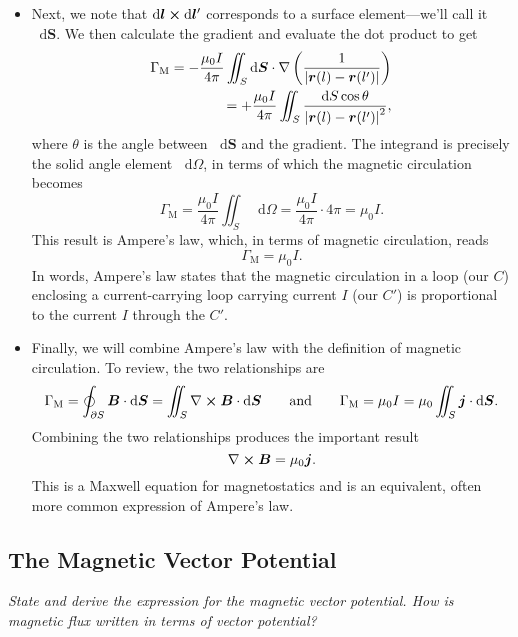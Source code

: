 \documentclass[11pt, a4paper]{article}
\newcommand{\diff}{\mathop{}\!\mathrm{d}} %
\newcommand{\eqtext}[1]{\qquad \text{#1} \qquad}
\renewcommand{\vec}[1]{\bm{#1}} %
\renewcommand{\r}{\vec{r}}
\newcommand{\B}{\vec{B}} %
\newcommand{\mm}{\mu_{0}}  %
\renewcommand{\j}{\vec{j}}  %
\renewcommand{\curl}{\nabla \cross}
\renewcommand{\grad}{\nabla}
\begin{document}
\begin{itemize}
    \item Next, we note that $ \diff \vec{l} \cross \diff \vec{l}' $ corresponds to a surface element---we'll call it $ \diff \vec{S} $. We then calculate the gradient and evaluate the dot product to get
	\begin{align*}
		\Gamma_{\text{M}} =  - \frac{\mm I}{4\pi} \iint_{S} \diff \vec{S}\cdot \grad \left(\frac{1}{\abs{\r(l) - \r(l')}}\right) \\
		= +  \frac{\mm I}{4\pi} \iint_{S}  \frac{\diff S \cos \theta}{\abs{\r(l) - \r(l')}^{2}},
	\end{align*}
	where $ \theta $ is the angle between $ \diff \vec{S} $ and the gradient. The integrand is precisely the solid angle element $ \diff \Omega $, in terms of which the magnetic circulation becomes
	\begin{equation*}
		\Gamma_{\text{M}} = \frac{\mm I}{4\pi} \iint_{S} \diff \Omega =  \frac{\mm I}{4\pi}  \cdot 4 \pi = \mm I.
	\end{equation*}
	This result is Ampere's law, which, in terms of magnetic circulation, reads
	\begin{equation*}
		\Gamma_{\text{M}} = \mm I.
	\end{equation*}
    In words, Ampere's law states that the magnetic circulation in a loop (our $ C $) enclosing a current-carrying loop carrying current $ I $ (our $ C' $) is proportional to the current $ I $ through the $ C' $.
	
	\item Finally, we will combine Ampere's law with the definition of magnetic circulation. To review, the two relationships are
	\begin{equation*}
		\Gamma_{\text{M}} = \oint_{\partial S} \B \cdot \diff \vec{S} = \iint_{S} \curl \B \cdot \diff \vec{S} \eqtext{and} \Gamma_{\text{M}} = \mm I = \mm \iint_{S} \j \cdot \diff \vec{S}.
	\end{equation*}
    Combining the two relationships produces the important result
	\begin{equation*}
		\curl \B = \mm \j.
	\end{equation*}
	This is a Maxwell equation for magnetostatics and is an equivalent, often more common expression of Ampere's law.
	
\end{itemize}

\subsection{The Magnetic Vector Potential} \label{ss:magnetic-potential}
\textit{State and derive the expression for the magnetic vector potential. How is magnetic flux written in terms of vector potential?}
\end{document}
